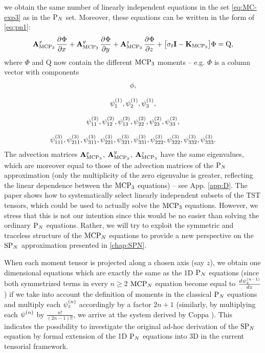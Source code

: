 we obtain the same number of linearly independent equations in the set \eqref{eq:MC-exp3} as in the $\PN$ set. Moreover,
these equations can be written in the form of \eqref{eq:pn1}:
\begin{equation}\label{eq:mcpn1}
	\mat{A}_{\MCPN[3]}^x\,\pd{\Phi}{x} + \mat{A}_{\MCPN[3]}^y\,\pd{\Phi}{y} +
	\mat{A}_{\MCPN[3]}^z\,\pd{\Phi}{z} + \bigl[\sigma_t\mat{I} - \mathbf{K}_{\MCPN[3]}\bigr]\Phi =
	\mathrm{Q},
\end{equation}
where $\Phi$ and $\mathrm{Q}$ now contain the different $\MCPN[3]$ moments -- e.g. $\Phi$ is a column vector with
components 
$$
\begin{gathered}
\phi,\\[.75em]
\fmom[1]_{1},\fmom[1]_{2},\fmom[1]_{3},\\[.75em]
\fmom[2]_{11},\fmom[2]_{12},\fmom[2]_{13},\fmom[2]_{22},\fmom[2]_{23},\fmom[2]_{33},\\[.75em]
\fmom[3]_{111},\fmom[3]_{211},\fmom[3]_{311},\fmom[3]_{221},\fmom[3]_{321},\fmom[3]_{331},\fmom[3]_{222},\fmom[3]_{322},\fmom[3]_{332},\fmom[3]_{333}.
\end{gathered}
$$
The advection matrices $\mat{A}_{\MCPN[3]}^x$, $\mat{A}_{\MCPN[3]}^y$, $\mat{A}_{\MCPN[3]}^z$ have the same eigenvalues,
which are moreover equal to those of the advection matrices of the $\PN$ approximation (only the multiplicity
of the zero eigenvalue is greater, reflecting the linear dependence between the $\MCPN[3]$ equations) -- see App.
\ref{app:D}. The paper \cite{Applequist1} shows how to systematically select linearly independent subsets of the TST
tensors, which could be used to actually solve the $\MCPN[3]$ equations. However, we stress that this is not our
intention since this would be no easier than solving the ordinary $\PN$ equations. Rather, we will try to exploit the
symmetric and traceless structure of the $\MCPN$ equations to provide a new perspective on the $\SPN$ approximation
presented in \cref{chap:SPN}.

When
each moment tensor is projected along a chosen axis (say $z$), we obtain one dimensional equations which are exactly
the same as the 1D $\PN$ equations (since both symmetrized terms in every $n \geq 2$ $\MCPN$ equation become equal to
$\der{\fmom[n-1]_z}{z}$) if we take into account the definition of moments in the classical $\PN$ equations and multiply
each $\fmom[n]_z$ accordingly by a factor ${2n+1}$ (similarly, by multiplying each $\fmom[n]$ by $\frac{n!}{(2n-1)!!}$, 
we arrive at the system derived by Coppa \cite{Coppa3}). This indicates the possibility to investigate the original ad-hoc
derivation of the $\SPN$ equation by formal extension of the 1D $\PN$ equations into 3D in the current tensorial
framework.  

